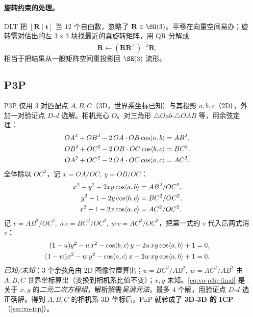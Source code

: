 \paragraph{旋转约束的处理\cite{gaoxiang2019slam14}。}DLT 把 $[\mathbf{R}\mid\mathbf{t}]$ 当 $12$ 个自由数，忽略了 $\mathbf{R}\in\SO(3)$。平移在向量空间易办；旋转需对估出的左 $3\times3$ 块找最近的真旋转矩阵，用 QR 分解或
\begin{equation}
  \mathbf{R}\leftarrow(\mathbf{R}\mathbf{R}^\top)^{-\frac12}\mathbf{R},
  \label{eq:vo-dlt-Rproj}
\end{equation}
相当于把结果从一般矩阵空间重投影回 $\SE(3)$ 流形。

\subsection{P3P}
\label{sec:vo-p3p}

\begin{derivation}[P3P：用余弦定理把问题化为二元二次方程组]
\label{thm:vo-p3p}
P3P 仅用 $3$ 对匹配点 $A,B,C$（3D，世界系坐标已知）与其投影 $a,b,c$（2D），外加一对验证点 $D$-$d$ 选解\cite{gaoxiang2019slam14}。相机光心 $O$。对三角形 $\triangle Oab$-$\triangle OAB$ 等，用余弦定理：
\begin{align}
  OA^2+OB^2-2\,OA\cdot OB\cos\langle a,b\rangle&=AB^2,\notag\\
  OB^2+OC^2-2\,OB\cdot OC\cos\langle b,c\rangle&=BC^2,\notag\\
  OA^2+OC^2-2\,OA\cdot OC\cos\langle a,c\rangle&=AC^2.
  \label{eq:vo-p3p-cos}
\end{align}
全体除以 $OC^2$，记 $x=OA/OC,\ y=OB/OC$：
\begin{align}
  x^2+y^2-2xy\cos\langle a,b\rangle&=AB^2/OC^2,\notag\\
  y^2+1-2y\cos\langle b,c\rangle&=BC^2/OC^2,\notag\\
  x^2+1-2x\cos\langle a,c\rangle&=AC^2/OC^2.
  \label{eq:vo-p3p-xy}
\end{align}
记 $v=AB^2/OC^2,\ u\,v=BC^2/OC^2,\ w\,v=AC^2/OC^2$，把第一式的 $v$ 代入后两式消 $v$：
\begin{align}
  (1-u)y^2-u\,x^2-\cos\langle b,c\rangle\,y+2u\,xy\cos\langle a,b\rangle+1&=0,\notag\\
  (1-w)x^2-w\,y^2-\cos\langle a,c\rangle\,x+2w\,xy\cos\langle a,b\rangle+1&=0.
  \label{eq:vo-p3p-final}
\end{align}
\emph{已知/未知}：$3$ 个余弦角由 2D 图像位置算出；$u=BC^2/AB^2,\ w=AC^2/AB^2$ 由 $A,B,C$ 世界坐标算出（变换到相机系比值不变）；$x,y$ 未知。\cref{eq:vo-p3p-final} 是关于 $x,y$ 的\emph{二元二次方程组}，解析解需\emph{吴消元法}，最多 $4$ 个解，用验证点 $D$-$d$ 选正确解。得到 $A,B,C$ 的相机系 3D 坐标后，PnP 就转成了 \textbf{3D-3D 的 ICP}（\cref{sec:vo-icp}）。
\end{derivation}

